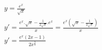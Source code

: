 \begin{ex}
\begin{align}
&y=\frac{e^x}{\sqrt{x}}\nonumber\\
&y'=\frac{e^x.\sqrt{x}-\frac{1}{2\sqrt{x}}.e^x}{x}=\frac{e^x\left(\sqrt{x}-\frac{1}{2\sqrt{x}}\right)}{x}\nonumber\\
&y'=\frac{e^x(2x-1)}{2x^\frac{3}{2}}\nonumber
\end{align}
\end{ex}
